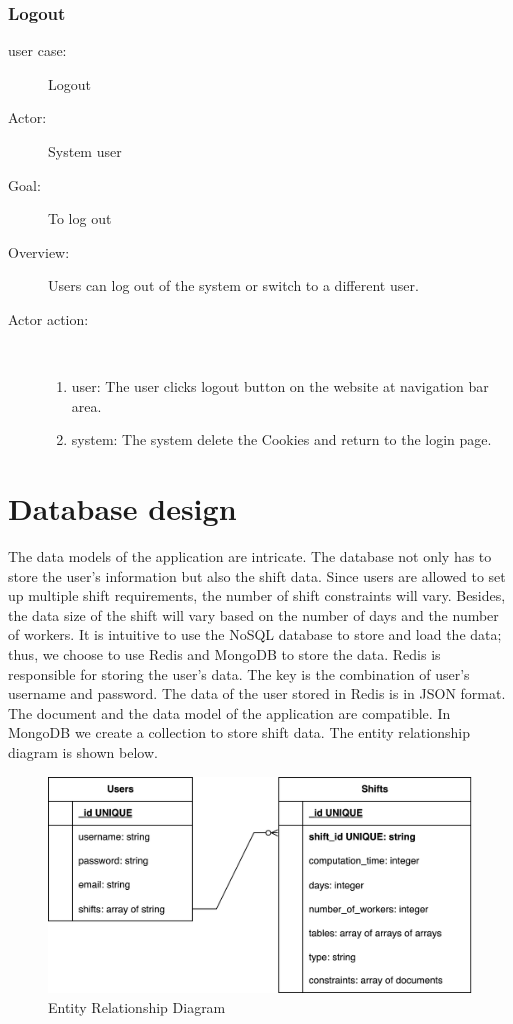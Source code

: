 \documentclass[11pt, oneside]{article}   	%
\begin{document}
\subsubsection{Logout}
\begin{description}
\item[user case:] Logout
\item[Actor:] System user
\item[Goal:] To log out
\item[Overview:] Users can log out of the system or switch to a different user.
\item[Actor action:]
\
\begin{enumerate}
\item user: The user clicks logout button on the website at navigation bar area.
\item system: The system delete the Cookies and return to the login page.
\end{enumerate}
\end{description}

\section{Database design}
The data models of the application are intricate. The database not only has to store the user’s information but also the shift data. Since users are allowed to set up multiple shift requirements, the number of shift constraints will vary. Besides, the data size of the shift will vary based on the number of days and the number of workers. It is intuitive to use the NoSQL database to store and load the data; thus, we choose to use Redis and MongoDB to store the data. Redis is responsible for storing the user's data. The key is the combination of user's username and password. The data of the user stored in Redis is in JSON format. The document and the data model of the application are compatible. In MongoDB we create a collection to store shift data. The entity relationship diagram is shown below.


\begin{figure}[h]
\centering
\includegraphics[width=\textwidth]{ erd }
\caption{Entity Relationship Diagram}
\label{erd}
\end{figure}
\end{document}
